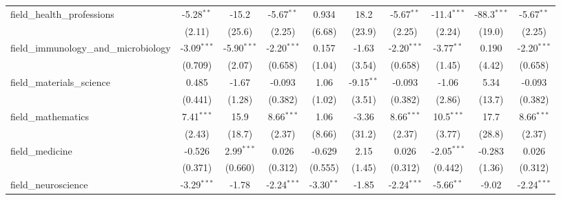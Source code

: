 \begin{tabular}{lccccccccc}
   field\_health\_professions                                  & -5.28$^{**}$  & -15.2          & -5.67$^{**}$  & 0.934         & 18.2          & -5.67$^{**}$  & -11.4$^{***}$ & -88.3$^{***}$  & -5.67$^{**}$\\   
                                                               & (2.11)        & (25.6)         & (2.25)        & (6.68)        & (23.9)        & (2.25)        & (2.24)        & (19.0)         & (2.25)\\   
   field\_immunology\_and\_microbiology                        & -3.09$^{***}$ & -5.90$^{***}$  & -2.20$^{***}$ & 0.157         & -1.63         & -2.20$^{***}$ & -3.77$^{**}$  & 0.190          & -2.20$^{***}$\\   
                                                               & (0.709)       & (2.07)         & (0.658)       & (1.04)        & (3.54)        & (0.658)       & (1.45)        & (4.42)         & (0.658)\\   
   field\_materials\_science                                   & 0.485         & -1.67          & -0.093        & 1.06          & -9.15$^{**}$  & -0.093        & -1.06         & 5.34           & -0.093\\   
                                                               & (0.441)       & (1.28)         & (0.382)       & (1.02)        & (3.51)        & (0.382)       & (2.86)        & (13.7)         & (0.382)\\   
   field\_mathematics                                          & 7.41$^{***}$  & 15.9           & 8.66$^{***}$  & 1.06          & -3.36         & 8.66$^{***}$  & 10.5$^{***}$  & 17.7           & 8.66$^{***}$\\   
                                                               & (2.43)        & (18.7)         & (2.37)        & (8.66)        & (31.2)        & (2.37)        & (3.77)        & (28.8)         & (2.37)\\   
   field\_medicine                                             & -0.526        & 2.99$^{***}$   & 0.026         & -0.629        & 2.15          & 0.026         & -2.05$^{***}$ & -0.283         & 0.026\\   
                                                               & (0.371)       & (0.660)        & (0.312)       & (0.555)       & (1.45)        & (0.312)       & (0.442)       & (1.36)         & (0.312)\\   
   field\_neuroscience                                         & -3.29$^{***}$ & -1.78          & -2.24$^{***}$ & -3.30$^{**}$  & -1.85         & -2.24$^{***}$ & -5.66$^{**}$  & -9.02          & -2.24$^{***}$\\   

\end{tabular}
